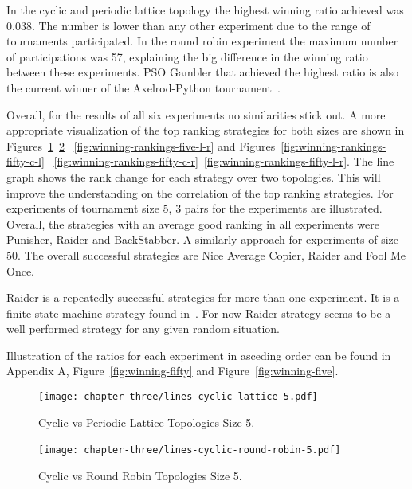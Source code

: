 In the cyclic and periodic lattice topology the highest winning ratio achieved
was 0.038. The number is lower than any other experiment due to the range of
tournaments participated. In the round robin experiment the maximum number of
participations was 57, explaining the big difference in the winning ratio between
these experiments. PSO Gambler that achieved the highest ratio is also the current
winner of the Axelrod-Python tournament~\cite{pso_gambler}.

Overall, for the results of all six experiments no similarities stick out.
A more appropriate visualization of the top ranking strategies for both
sizes are shown in Figures~\ref{fig:winning-rankings-five-c-l}~\ref{fig:winning-rankings-five-c-r}
~\ref{fig:winning-rankings-five-l-r} and Figures~\ref{fig:winning-rankings-fifty-c-l}
~\ref{fig:winning-rankings-fifty-c-r}~\ref{fig:winning-rankings-fifty-l-r}.
The line graph shows the rank change for each strategy over two topologies.
This will improve the understanding on the correlation of the top ranking strategies.
For experiments of tournament size 5, 3
pairs for the experiments are illustrated. Overall, the strategies with an
average good ranking in all experiments were Punisher, Raider and BackStabber.
A similarly approach for experiments of size 50.
The overall successful strategies are Nice Average Copier, Raider and Fool Me Once.

Raider is a repeatedly successful strategies for more than one experiment.
It is a finite state machine strategy found in~\cite{DBLP:conf/foci/AshlockTA14}.
For now Raider strategy seems to be a well performed strategy for any
given random situation.

Illustration of the ratios for each experiment in asceding order can be found
in Appendix A, Figure~\ref{fig:winning-fifty} and Figure~\ref{fig:winning-five}.

\begin{figure}[H]
  \centering
      \texttt{[image: chapter-three/lines-cyclic-lattice-5.pdf]}
  \caption{Cyclic vs Periodic Lattice Topologies Size 5.}
  \label{fig:winning-rankings-five-c-l}
\end{figure}

\begin{figure}[H]
\centering
    \texttt{[image: chapter-three/lines-cyclic-round-robin-5.pdf]}\
\caption{Cyclic vs Round Robin Topologies Size 5.}
\label{fig:winning-rankings-five-c-r}
\end{figure}

